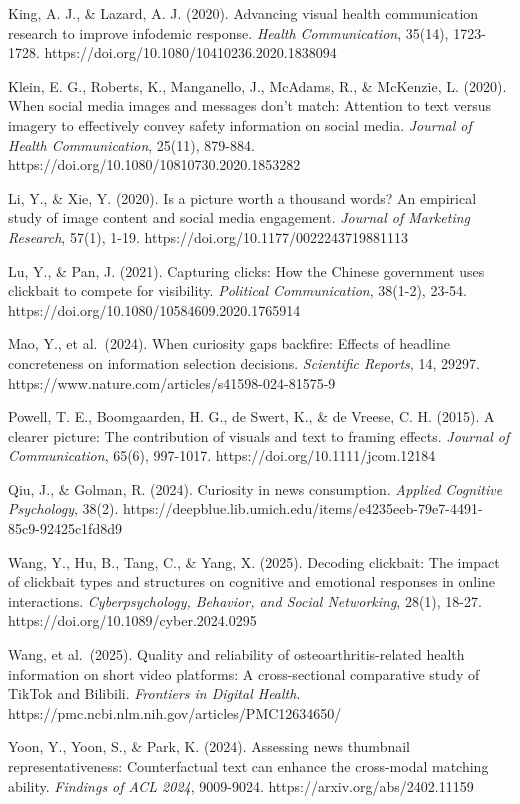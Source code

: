 \documentclass[
  12pt,
]{article}
\begin{document}
King, A. J., \& Lazard, A. J. (2020). Advancing visual health
communication research to improve infodemic response. \emph{Health
Communication}, 35(14), 1723-1728.
https://doi.org/10.1080/10410236.2020.1838094

Klein, E. G., Roberts, K., Manganello, J., McAdams, R., \& McKenzie, L.
(2020). When social media images and messages don't match: Attention to
text versus imagery to effectively convey safety information on social
media. \emph{Journal of Health Communication}, 25(11), 879-884.
https://doi.org/10.1080/10810730.2020.1853282

Li, Y., \& Xie, Y. (2020). Is a picture worth a thousand words? An
empirical study of image content and social media engagement.
\emph{Journal of Marketing Research}, 57(1), 1-19.
https://doi.org/10.1177/0022243719881113

Lu, Y., \& Pan, J. (2021). Capturing clicks: How the Chinese government
uses clickbait to compete for visibility. \emph{Political
Communication}, 38(1-2), 23-54.
https://doi.org/10.1080/10584609.2020.1765914

Mao, Y., et al.~(2024). When curiosity gaps backfire: Effects of
headline concreteness on information selection decisions.
\emph{Scientific Reports}, 14, 29297.
https://www.nature.com/articles/s41598-024-81575-9

Powell, T. E., Boomgaarden, H. G., de Swert, K., \& de Vreese, C. H.
(2015). A clearer picture: The contribution of visuals and text to
framing effects. \emph{Journal of Communication}, 65(6), 997-1017.
https://doi.org/10.1111/jcom.12184

Qiu, J., \& Golman, R. (2024). Curiosity in news consumption.
\emph{Applied Cognitive Psychology}, 38(2).
https://deepblue.lib.umich.edu/items/e4235eeb-79e7-4491-85c9-92425c1fd8d9

Wang, Y., Hu, B., Tang, C., \& Yang, X. (2025). Decoding clickbait: The
impact of clickbait types and structures on cognitive and emotional
responses in online interactions. \emph{Cyberpsychology, Behavior, and
Social Networking}, 28(1), 18-27.
https://doi.org/10.1089/cyber.2024.0295

Wang, et al.~(2025). Quality and reliability of osteoarthritis-related
health information on short video platforms: A cross-sectional
comparative study of TikTok and Bilibili. \emph{Frontiers in Digital
Health}. https://pmc.ncbi.nlm.nih.gov/articles/PMC12634650/

Yoon, Y., Yoon, S., \& Park, K. (2024). Assessing news thumbnail
representativeness: Counterfactual text can enhance the cross-modal
matching ability. \emph{Findings of ACL 2024}, 9009-9024.
https://arxiv.org/abs/2402.11159
\end{document}
